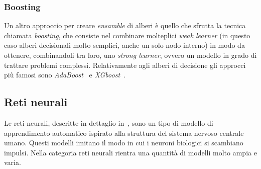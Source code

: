 \subsubsection{Boosting}
Un altro approccio per creare \emph{ensamble} di alberi è quello che sfrutta la tecnica chiamata \emph{boosting}, che consiste nel combinare molteplici \emph{weak learner} (in questo caso alberi decisionali molto semplici, anche un solo nodo interno) in modo da ottenere, combinandoli tra loro, uno \emph{strong learner}, ovvero un modello in grado di trattare problemi complessi.
Relativamente agli alberi di decisione gli approcci più famosi sono \emph{AdaBoost}~\cite{adaboost} e \emph{XGboost}~\cite{xgboost}.


\subsection{Reti neurali}
Le reti neurali, descritte in dettaglio in~\cite{neural_networks}, sono un tipo di modello di apprendimento automatico ispirato alla struttura del sistema nervoso centrale umano.
Questi modelli imitano il modo in cui i neuroni biologici si scambiano impulsi.
Nella categoria reti neurali rientra una quantità di modelli molto ampia e varia.

